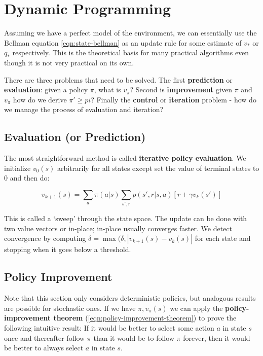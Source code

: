\documentclass[11pt]{report}
\begin{document}
\chapter{Dynamic Programming}
Assuming we have a perfect model of the environment, we can essentially use the Bellman equation \autoref{eqn:state-bellman} as an update rule for some estimate of $v_*$ or $q_*$ respectively. This is the theoretical basis for many practical algorithms even though it is not very practical on its own.


There are three problems that need to be solved. The first \textbf{prediction} or \textbf{evaluation}: given a policy $\pi$, what is $v_\pi$? Second is \textbf{improvement} given $\pi$ and $v_\pi$ how do we derive $\pi' \ge pi$? Finally the \textbf{control} or \textbf{iteration} problem - how do we manage the process of evaluation and iteration?

\section{Evaluation (or Prediction)}
The most straightforward method is called \textbf{iterative policy evaluation}. We initialize $v_0(s)$ arbitrarily for all states except set the value of terminal states to 0 and then do:

\begin{equation}
	\label{eqn:iterative-policy-eval}
	v_{k+1}(s) = \sum_{a}\pi(a|s)\sum_{s',r}p(s',r|s,a)[r+\gamma v_k(s')]
\end{equation}

This is called a `sweep' through the state space. The update can be done with two value vectors or in-place; in-place usually converges faster. We detect convergence by computing $\delta = \max(\delta, |v_{k+1}(s) - v_k(s)|$ for each state and stopping when it goes below a threshold.


\section{Policy Improvement}
Note that this section only considers deterministic policies, but analogous results are possible for stochastic ones. If we have $\pi, v_\pi(s)$ we can apply the \textbf{policy-improvement theorem} (\autoref{eqn:policy-improvement-theorem}) to prove the following intuitive result: If it would be better to select some action $a$ in state $s$ once and thereafter follow $\pi$ than it would be to follow $\pi$ forever, then it would be better to always select $a$ in state $s$.
\end{document}
